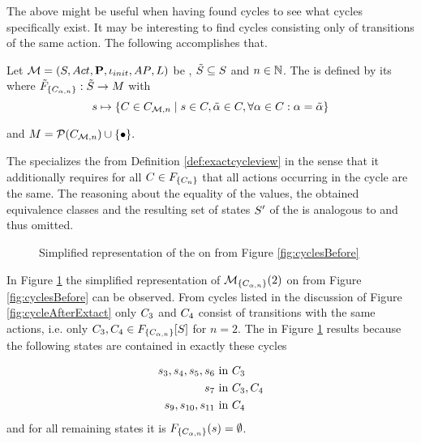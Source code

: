 \documentclass[preview]{standalone}
\begin{document}
The above \viewN might be useful when having found cycles to see what cycles specifically exist. It may be interesting to find cycles consisting only of transitions of the same action. The following \viewN accomplishes that.

\begin{definition}
	Let ${{{\mathcal{M}}}} = {{({S}, {Act}, {\textbf{P}}, {\iota_{init}}, {AP}, {L})}}$ be \achgphN, ${\tilde{{S}}} \subseteq {S}$ and $n \in {\mathbb{N}}$. The \viewN \viewexactactcycle is defined by its \grpfctN \gfctexactactcycle where ${{\tilde{F}_{{\{{C}_{{\alpha},n}\}}}}} : {\tilde{{S}}} \to {\ensuremath{{M}}}$ with
	\[
	\state \mapsto \{\cycle \in \cycleset \mid \state \in \cycle, \tilde{\action} \in \cycle, \forall \action \in \cycle : \action = \tilde{\action} \}
	\]
	
	and $\imggrp = \powerset{\cycleset} \cup \remset.$
\end{definition}

The \viewN specializes the \viewN from Definition \ref{def:exactcycleview} in the sense that it additionally requires for all ${C} \in {\ensuremath{{F_{{\{{C}_n\}}}}}}$ that all actions occurring in the cycle are the same. The reasoning about the equality of the \grpfctN values, the obtained equivalence classes and the resulting set of states ${S}'$ of the \viewN is analogous to \viewexactcycle and thus omitted.

\begin{figure}[!htb]
	\centering	
		
	\caption{Simplified representation of the \viewN \viewcycleset on \mdp from Figure \ref{fig:cyclesBefore}}
	\label{fig:cycleAfterExactAct2}
\end{figure}

\begin{exmp}
	In Figure \ref{fig:cycleAfterExactAct2} the simplified representation of ${{{{{\mathcal{M}}}}_{{\{{C}_{{\alpha},n}\}}}}}(2)$ on \chgph from Figure \ref{fig:cyclesBefore} can be observed. From cycles listed in the discussion of Figure \ref{fig:cycleAfterExtact} only ${C}_3$ and ${C}_4$ consist of transitions with the same actions, i.e. only ${C}_3, {C}_4 \in {\ensuremath{{F_{{\{{C}_{{\alpha},n}\}}}}}}[{S}]$ for $n = 2$. The \viewN \viewexactactcycle in Figure \ref{fig:cycleAfterExactAct2} results because the following states are contained in exactly these cycles

\begin{align*}
	{s}_3, {s}_4, {s}_5, {s}_6 &\text{ in } {C}_3 \\
	{s}_7 &\text{ in } {C}_3, {C}_4 \\
	{s}_9, {s}_{10}, {s}_{11} &\text{ in } {C}_4
\end{align*}
and for all remaining states \states it is ${{F_{{\{{C}_{{\alpha},n}\}}}}}({s}) = \emptyset$.
\end{exmp}
\end{document}
